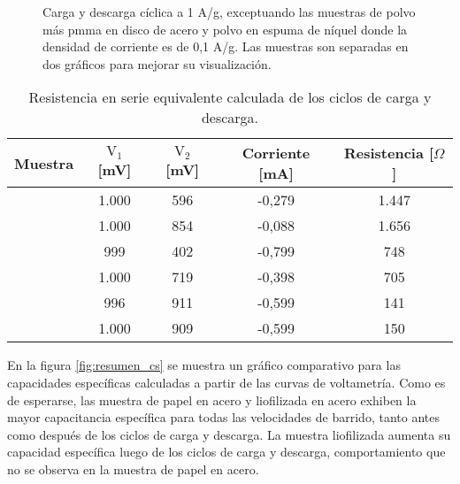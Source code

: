 \begin{figure}[h!]
\begin{subfigure}{0.4\textwidth}
	\end{subfigure}
	\caption{Carga y descarga cíclica a 1 A/g, exceptuando las muestras de polvo más pmma en disco de acero y polvo en espuma de níquel donde la densidad de corriente es de 0,1 A/g. Las muestras son separadas en dos gráficos para mejorar su visualización.}
	\label{fig:resumen_ccd}
\end{figure}


\begin{table}[h!]
	\centering
	\caption{Resistencia en serie equivalente calculada de los ciclos de carga y descarga.}
	\begin{tabular}{l c c c c}
			Muestra	&	$\mathrm{V_1}$ [mV]	&	$\mathrm{V_2}$ [mV]	&	Corriente [mA]	&	Resistencia [$\Omega$]	\\
		\hline
		\mPolvoAceroPMMA		&	1.000	&	596	&	-0,279	&	1.447	\\
		\mPolvoNiquel			&	1.000	&	854	&	-0,088	&	1.656	\\
		\mPolvoNiquelPMMA		&	999		&	402	&	-0,799	&	748		\\
		\mPolvoAcero			&	1.000	&	719	&	-0,398	&	705		\\
		\mPapelAcero			&	996		&	911	&	-0,599	&	141		\\
		\mLiofilizadoAcero		&	1.000	&	909	&	-0,599	&	150		\\
	\end{tabular}
	\label{tab:esr}
\end{table}


En la figura \ref{fig:resumen_cs} se muestra un gráfico comparativo para las capacidades específicas calculadas a partir de las curvas de voltametría. Como es de esperarse, las muestra de papel en acero y liofilizada en acero exhiben la mayor capacitancia específica para todas las velocidades de barrido, tanto antes como después de los ciclos de carga y descarga. La muestra liofilizada aumenta su capacidad específica luego de los ciclos de carga y descarga, comportamiento que no se observa en la muestra de papel en acero.




